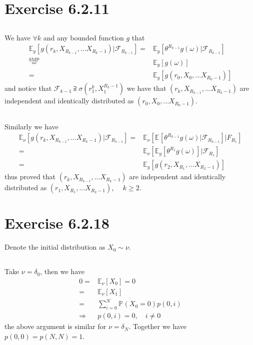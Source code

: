\documentclass[11pt,a4paper]{ctexart}
\numberwithin{equation}{section}%
\newcommand{\F}{\mathcal{F}}
\begin{document}
\section{Exercise 6.2.11}


\subsection{}
We have $ \forall k $ and any bounded function $ g $ that
\begin{align*}
    \mathbb{E}_{ y }\left[ g(r_k,X_{R_{k-1}},\ldots X_{R_{k}-1}) | \F_{R_{k-1}} \right]=& \mathbb{E}_{ y }\left[ \theta ^{R_{k-1}}g(\omega ) | \F_{R_{k-1}} \right] \\
    \mathop{ = }\limits^{\text{SMP}} & \mathbb{E}_{ y }\left[ g(\omega ) \right] \\
    =& \mathbb{E}_{ y }\left[ g(r_0,X_0,\ldots X_{R_{0}-1}) \right]
\end{align*}
and notice that $ \F_{k-1}\supseteqq \sigma (r_1^{k},X_1^{R_{k}-1}) $ we have that $ (r_k,X_{R_{k-1}},\ldots X_{R_{k}-1}) $ are independent and identically distributed as $ (r_0,X_0,\ldots X_{R_{0}-1}) $.

\subsection{}

Similarly we have
\begin{align*}
    \mathbb{E}_{ \nu  }\left[ g(r_k,X_{R_{k-1}},\ldots X_{R_{k}-1}) | \F_{R_{k-1}} \right]
    =&\mathbb{E}_{ \nu  }\left[ \mathbb{E}_{  }\left[ \theta ^{R_{k-1}} g(\omega ) | \F_{R_{k-1}} \right] |F_{R_1} \right]\\
    =&\mathbb{E}_{ \nu  }\left[ \mathbb{E}_{ y }\left[ \theta ^{R_1}g(\omega ) \right] |\F_{R_1} \right]  \\
    =&\mathbb{E}_{ y }\left[ g(r_2,X_{R_{1}},\ldots X_{R_{2}-1}) \right]
\end{align*}
thus proved that $ (r_k,X_{R_{k-1}},\ldots X_{R_{k}-1}) $ are independent and identically distributed as $ (r_1,X_{R_{1}},\ldots X_{R_{2}-1}) $, $ \quad k\geq 2 $.

\section{Exercise 6.2.18}

Denote the initial distribution as $ X_0\sim \nu  $.

\subsection{}
Take $ \nu =\delta _0 $, then we have 
\begin{align*}
 0 =& \mathbb{E}_{ \nu  }\left[ X_0 \right] =0\\
 =& \mathbb{E}_{ \nu  }\left[ X_1 \right] \\
 =& \sum_{i=0}^N \mathbb{P}_{  }\left( X_0=0 \right)p(0,i)\\
  \Rightarrow & p(0,i) =0, \quad i\neq 0 
\end{align*}
the above argument is similar for $ \nu =\delta _N $. Together we have $ p(0,0)=p(N,N)=1 $.
\end{document}
